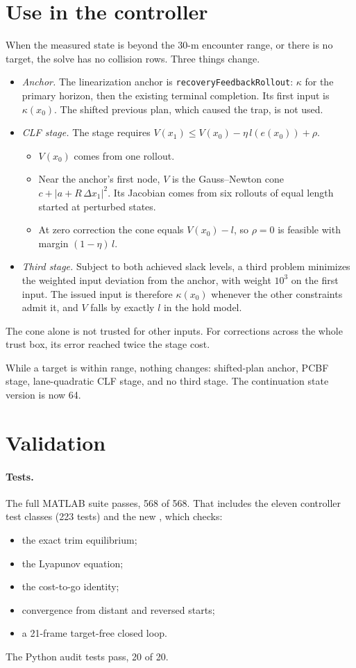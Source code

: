 \documentclass[11pt]{article}
\begin{document}
\section{Use in the controller}
When the measured state is beyond the 30-m encounter range, or there is no
target, the solve has no collision rows. Three things change.
\begin{itemize}
\item \emph{Anchor.} The linearization anchor is \texttt{recoveryFeedbackRollout}:
$\kappa$ for the primary horizon, then the existing terminal completion. Its
first input is $\kappa(x_0)$. The shifted previous plan, which caused the trap,
is not used.
\item \emph{CLF stage.} The stage requires
$V(x_1)\le V(x_0)-\eta\,l(e(x_0))+\rho$.
\begin{itemize}
\item $V(x_0)$ comes from one rollout.
\item Near the anchor's first node, $V$ is the Gauss--Newton cone $c+|a+R\,\Delta x_1|^2$. Its Jacobian comes from six rollouts of equal length started at perturbed states.
\item At zero correction the cone equals $V(x_0)-l$, so $\rho=0$ is feasible with margin $(1-\eta)\,l$.
\end{itemize}
\item \emph{Third stage.} Subject to both achieved slack levels, a third
problem minimizes the weighted input deviation from the anchor, with weight
$10^3$ on the first input. The issued input is therefore $\kappa(x_0)$ whenever
the other constraints admit it, and $V$ falls by exactly $l$ in the hold
model.
\end{itemize}
The cone alone is not trusted for other inputs. For corrections across the
whole trust box, its error reached twice the stage cost.

While a target is within range, nothing changes: shifted-plan anchor, PCBF
stage, lane-quadratic CLF stage, and no third stage. The continuation state
version is now 64.

\section{Validation}
\paragraph{Tests.} The full MATLAB suite passes, 568 of 568. That includes the eleven
controller test classes (223 tests) and the new
, which checks:
\begin{itemize}
\item the exact trim equilibrium;
\item the Lyapunov equation;
\item the cost-to-go identity;
\item convergence from distant and reversed starts;
\item a 21-frame target-free closed loop.
\end{itemize}
The Python audit tests pass, 20 of 20.
\end{document}
